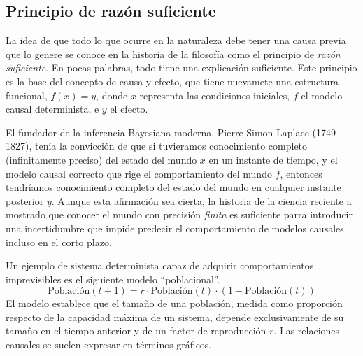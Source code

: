 \documentclass[a4paper,10pt]{book}
\theoremstyle{definition}
\begin{document}
\subsection{Principio de razón suficiente}

La idea de que todo lo que ocurre en la naturaleza debe tener una causa previa que lo genere se conoce en la historia de la filosofía como el principio de \emph{razón suficiente}.
%
En pocas palabras, todo tiene una explicación suficiente.
%
Este principio es la base del concepto de causa y efecto, que tiene nuevamete una estructura funcional, $f(x) = y$, donde $x$ representa las condiciones iniciales, $f$ el modelo causal determinista, e $y$ el efecto.


El fundador de la inferencia Bayesiana moderna, Pierre-Simon Laplace (1749-1827), tenía la convicción de que si tuvieramos conocimiento completo (infinitamente preciso) del estado del mundo $x$ en un instante de tiempo, y el modelo causal correcto que rige el comportamiento del mundo $f$, entonces tendríamos conocimiento completo del estado del mundo en cualquier instante posterior $y$.
%
Aunque esta afirmación sea cierta, la historia de la ciencia reciente a mostrado que conocer el mundo con precisión \emph{finita} es suficiente parra introducir una incertidumbre que impide predecir el comportamiento de modelos causales incluso en el corto plazo.


Un ejemplo de sistema determinista capaz de adquirir comportamientos imprevisibles es el siguiente modelo ``poblacional''.
%
\begin{equation}
 \text{Población}(t+1) = r \cdot \text{Población}(t)\cdot (1-\text{Población}(t))
\end{equation}
%
El modelo establece que el tamaño de una población, medida como proporción respecto de la capacidad máxima de un sistema, depende exclusivamente de su tamaño en el tiempo anterior y de un factor de reproducción $r$.
%
Las relaciones causales se suelen expresar en términos gráficos.
\end{document}
